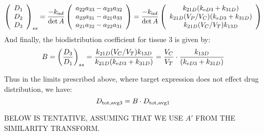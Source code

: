 \[
\left(\begin{array}{c}
D_{1}\\
D_{2}\\
D_{3}
\end{array}\right)_{ss} = \frac{-k_{\text{inf}}}{\det A} \left(\begin{array}{c}
a_{22}a_{33}-a_{23}a_{32}\\
a_{23}a_{31}-a_{21}a_{33}\\
a_{21}a_{32}-a_{22}a_{31}
\end{array}\right) = \frac{-k_{\text{inf}}}{\det A} \left(\begin{array}{c}
k_{21D}(k_{\text{e} D3}+k_{31D})\\
k_{21D}(V_{P}/V_{C})(k_{eD3}+k_{31D})\\
k_{21D}(V_{C}/V_{T})k_{13D}
\end{array}\right)
\]
And finally, the biodistribution coefficient for tissue 3 is given
by:
\[
B=\left(\frac{D_{3}}{D_{1}}\right)_{ss}=\frac{k_{21D}(V_{C}/V_{T})k_{13D}}{k_{21D}(k_{\text{e} D3}+k_{31D})}=\frac{V_{C}}{V_{T}}\cdot\frac{k_{13D}}{(k_{\text{e} D3}+k_{31D})}
\]

Thus in the limits prescribed above, where target expression does
not effect drug distribution, we have:
\[
D_{\text{tot},\text{avg}3}=B\cdot D_{\text{tot},\text{avg}1}
\]

BELOW IS TENTATIVE, ASSUMING THAT WE USE $A'$ FROM THE SIMILARITY TRANSFORM. \\

